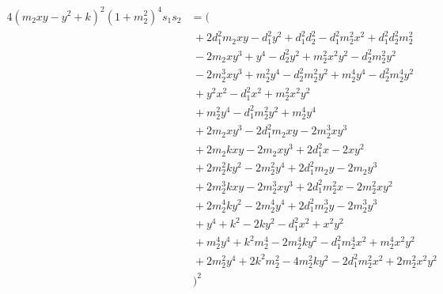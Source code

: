 \documentclass[11pt]{article}
\begin{document}
\begin{align*}
  4 (m_2 x y - y^2 + k)^2 (1 + m_2^2)^4 s_1 s_2
  &= (\\
  & ~+ 2 d_1^2 m_2 x y - d_1^2 y^2 + d_1^2 d_2^2 - d_1^2 m_2^2 x^2 + d_1^2 d_2^2 m_2^2\\
  & ~- 2 m_2 x y^3 + y^4 - d_2^2 y^2 + m_2^2 x^2 y^2 - d_2^2 m_2^2y^2\\
  & ~- 2 m_2^3 x y^3 + m_2^2 y^4 - d_2^2 m_2^2 y^2 + m_2^4 y^4 - d_2^2 m_2^4 y^2\\
  & ~+ y^2 x^2 - d_1^2 x^2 + m_2^2 x^2 y^2\\
  & ~+ m_2^2 y^4 - d_1^2 m_2^2 y^2 + m_2^4 y^4\\
  & ~+ 2 m_2 x y^3 - 2 d_1^2 m_2 x y - 2 m_2^3 x y^3\\
  & ~+ 2 m_2 k x y - 2 m_2 x y^3 + 2 d_1^2 x - 2 x y^2\\
  & ~+ 2 m_2^2 k y^2 - 2 m_2^2 y^4 + 2 d_1^2 m_2 y - 2 m_2 y^3\\
  & ~+ 2 m_2^3 k x y - 2 m_2^3 x y^3 + 2 d_1^2 m_2^2 x - 2 m_2^2 x y^2\\
  & ~+ 2 m_2^4 k y^2 - 2 m_2^4 y^4 + 2 d_1^2 m_2^3 y - 2 m_2^3 y^3\\
  & ~+ y^4 + k^2 - 2 k y^2 - d_1^2 x^2 + x^2 y^2\\
  & ~+ m_2^4 y^4 + k^2 m_2^4 - 2 m_2^4 k y^2 - d_1^2 m_2^4 x^2 + m_2^4 x^2 y^2\\
  & ~+ 2 m_2^2 y^4 + 2 k^2 m_2^2 - 4 m_2^2 k y^2 - 2 d_1^2 m_2^2 x^2 + 2 m_2^2 x^2 y^2\\
  & ~)^2
\end{align*}
\end{document}
